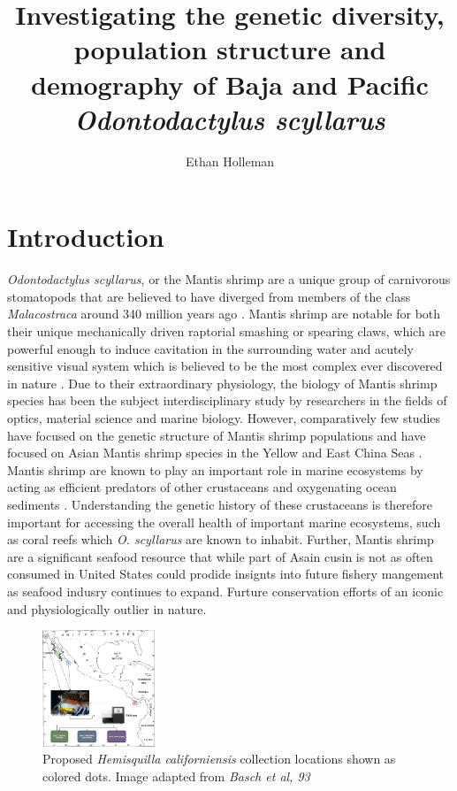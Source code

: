 \documentclass[11pt]{article}
\title{Investigating the genetic diversity, population structure and demography of Baja and Pacific \emph{Odontodactylus scyllarus}}
\date{}
\author{Ethan Holleman}
\begin{document}
\maketitle
\thispagestyle{empty}

\section*{Introduction}

\emph{Odontodactylus scyllarus}, or the Mantis shrimp are a unique group of carnivorous stomatopods that are believed to have diverged from members of the class \emph{Malacostraca} around 340 million years ago \cite{VanDerWal2017}. Mantis shrimp are notable for both their unique mechanically driven raptorial smashing or spearing claws, which are powerful enough to induce cavitation in the surrounding water \cite{Patek2004, Patek2005} and acutely sensitive visual system which is believed to be the most complex ever discovered in nature \cite{Cronin2014, Milius2012}. Due to their extraordinary physiology, the biology of Mantis shrimp species has been the subject interdisciplinary study by researchers in the fields of optics, material science and marine biology. However, comparatively few studies have focused on the genetic structure of Mantis shrimp populations and have focused on Asian Mantis shrimp species in the Yellow and East China Seas \cite{Yang2018}. Mantis shrimp are known to play an important role in marine ecosystems by acting as efficient predators of other crustaceans and oxygenating ocean sediments \cite{Antony2010}. Understanding the genetic history of these crustaceans is therefore important for accessing the overall health of important marine ecosystems, such as coral reefs which \emph{O. scyllarus} are known to inhabit. Further, Mantis shrimp are a significant seafood resource that while part of Asain cusin is not as often consumed in United States could prodide insignts into future fishery mangement as seafood indusry continues to expand. Furture conservation efforts of an iconic and physiologically outlier in nature.

\begin{figure}
	\begin{center}
		\includegraphics[width=0.30\textwidth]{images/sampling_locations.png}
	\end{center}
	\caption{Proposed \emph{Hemisquilla californiensis} collection locations shown as colored dots. Image adapted from \emph{Basch et al, 93}}
\end{figure}
\end{document}
